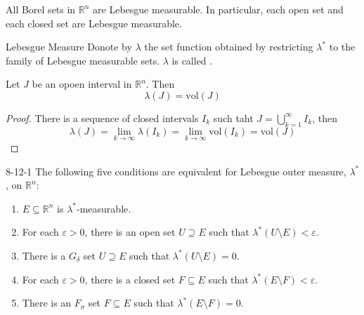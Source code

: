 \documentclass[../main.tex]{subfiles}
\begin{document}
\begin{corollary}{}{}
    All Borel sets in \(  \mathbb{R} ^{n}  \) are Lebesgue measurable. In particular, each open set and each closed set are Lebesgue measurable.  
\end{corollary}

\begin{definition}{Lebesgue Measure}{}
    Donote by \(   \lambda   \)  the set function obtained by restricting \(   \lambda ^{*}  \) to the family of Lebesgue measurable sets. \(   \lambda   \) is called .   
\end{definition}

\begin{corollary}{}{}
    Let \(  J  \) be an opoen interval in \(  \mathbb{R} ^{n}  \). Then \[
     \lambda \left( J \right)= \mathrm{vol}\left( J \right)  
    \]  
\end{corollary}
\begin{proof}
    There is a sequence of closed intervals \(  I _{k}  \)  such taht \(  J= \bigcup _{ k= 1}^{\infty}I _{k}  \), then \[
     \lambda \left( J \right)= \lim_{k\to \infty} \lambda \left( I _{k} \right)= \lim_{k\to \infty} \mathrm{vol}\left( I _{k} \right)= \mathrm{vol}\left( J \right)    
    \] 
\end{proof}

\begin{theorem}{}{8-12-1}
    The following five conditions are equivalent for Lebesgue outer measure, \(   \lambda ^{*}  \), on \(  \mathbb{R} ^{n}  \): 
    \begin{enumerate}
        \item \(  E\subseteq   \mathbb{R} ^{n}\) is \(   \lambda ^{*}  \)-measurable.
        \item For each \(   \varepsilon > 0  \), there is an open set \(  U \supseteq E  \) such that \(   \lambda ^{*}\left( U\setminus E \right)<  \varepsilon    \). 
        \item There is a \(  G_{ \delta }  \) set \(  U  \supseteq E\) such that \(   \lambda ^{*}\left( U\setminus E \right)= 0   \).   
        \item For each \(   \varepsilon > 0  \), there is a closed set \(  F\subseteq E  \) such that \(   \lambda ^{*}\left( E\setminus F \right)<  \varepsilon    \). 
        \item There is an \(  F_{ \sigma }  \) set \(  F\subseteq E  \) such that \(   \lambda ^{*}\left( E\setminus F \right)= 0   \).             
    \end{enumerate}
      
\end{theorem}
\end{document}
